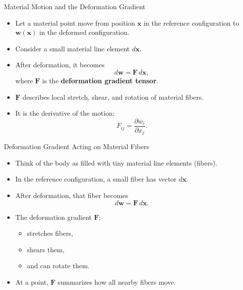 \documentclass{beamer}
\begin{document}
\begin{frame}{Material Motion and the Deformation Gradient}

\begin{itemize}

\item Let a material point move from position $\mathbf{x}$ in the reference configuration to $\mathbf{w}(\mathbf{x})$ in the deformed configuration.
\item Consider a small material line element $d\mathbf{x}$.
\item After deformation, it becomes
\[
d\mathbf{w} = \mathbf{F}\,d\mathbf{x},
\]
where $\mathbf{F}$ is the \textbf{deformation gradient tensor}.

\item $\mathbf{F}$ describes local stretch, shear, and rotation of material fibers.
\item It is the derivative of the motion:
\[
F_{ij} = \frac{\partial w_i}{\partial x_j}.
\]

\end{itemize}

\end{frame}

\begin{frame}{Deformation Gradient Acting on Material Fibers}

\begin{itemize}
    \item Think of the body as filled with tiny material line elements (fibers).
    \item In the reference configuration, a small fiber has vector
          $d\mathbf{x}$.
    \item After deformation, that fiber becomes
          \[
              d\mathbf{w} = \mathbf{F}\,d\mathbf{x}.
          \]
    \item The deformation gradient $\mathbf{F}$:
          \begin{itemize}
              \item stretches fibers,
              \item shears them,
              \item and can rotate them.
          \end{itemize}
    \item At a point, $\mathbf{F}$ summarizes how all nearby fibers move.
\end{itemize}

\vspace{0.3cm}



\end{frame}
\end{document}
